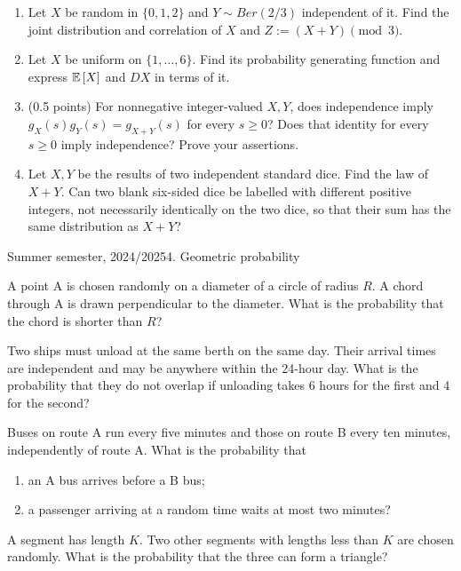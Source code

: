 \documentclass[a4paper]{report}
\begin{document}
\begin{problempencil}[T1, AM/Mathematics 2024]
\begin{enumerate}
\item Let $X$ be random in $\{0,1,2\}$ and $Y\sim Ber(2/3)$ independent of it. Find the joint distribution and correlation of $X$ and $Z:=(X+Y)\pmod3$.
\item Let $X$ be uniform on $\{1,\dots,6\}$. Find its probability generating function and express $\mathbb {E}\left[ X\right]$ and $DX$ in terms of it.
\item (0.5 points) For nonnegative integer-valued $X,Y$, does independence imply $g_X(s)g_Y(s)=g_{X+Y}(s)$ for every $s\ge0$? Does that identity for every $s\ge0$ imply independence? Prove your assertions.
\item Let $X,Y$ be the results of two independent standard dice. Find the law of $X+Y$. Can two blank six-sided dice be labelled with different positive integers, not necessarily identically on the two dice, so that their sum has the same distribution as $X+Y$?
\end{enumerate}
\end{problempencil}
\pagebreak
\noindent Summer semester, 2024/2025\hfill 4. Geometric probability
\par\noindent\hrulefill\par
\begin{problembook}
A point A is chosen randomly on a diameter of a circle of radius $R$. A chord through A is drawn perpendicular to the diameter. What is the probability that the chord is shorter than $R$?
\end{problembook}
\begin{problembook}
Two ships must unload at the same berth on the same day. Their arrival times are independent and may be anywhere within the 24-hour day. What is the probability that they do not overlap if unloading takes 6 hours for the first and 4 for the second?
\end{problembook}
\begin{problem}
Buses on route A run every five minutes and those on route B every ten minutes, independently of route A. What is the probability that
\begin{enumerate}\item an A bus arrives before a B bus;\item a passenger arriving at a random time waits at most two minutes?\end{enumerate}
\end{problem}
\begin{problembook}
A segment has length $K$. Two other segments with lengths less than $K$ are chosen randomly. What is the probability that the three can form a triangle?
\end{problembook}
\end{document}
